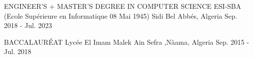 

\begin{cventries}

  \cventry
    {ENGINEER’S + MASTER’S DEGREE IN COMPUTER SCIENCE} %
    {ESI-SBA (Ecole Supérieure en Informatique 08 Mai 1945)} %
    {Sidi Bel Abbés, Algeria} %
    {Sep. 2018 - Jul. 2023} %
    {}

\end{cventries}

\begin{cventries}

  \cventry
    {BACCALAURÉAT} %
    {Lycée El Imam Malek} %
    {Ain Sefra ,Nàama, Algeria} %
    {Sep. 2015 - Jul. 2018} %
    {}

\end{cventries}